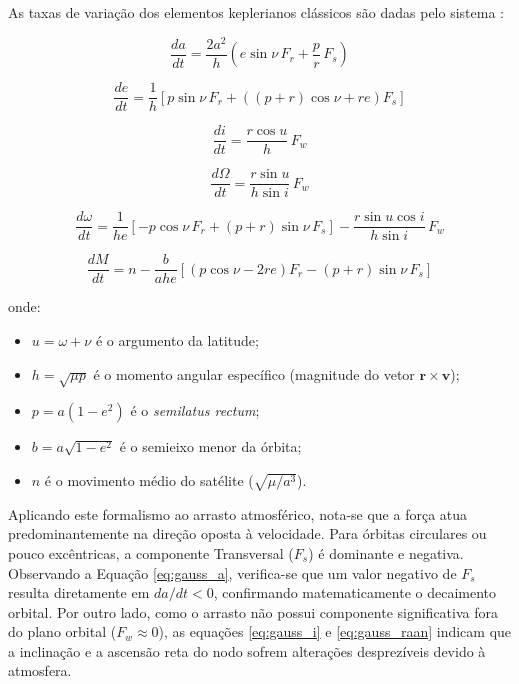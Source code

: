 As taxas de variação dos elementos keplerianos clássicos são dadas pelo sistema \cite{Vallado2013}:

\begin{equation} \label{eq:gauss_a}
    \frac{da}{dt} = \frac{2a^2}{h} \left( e \sin \nu \, F_r + \frac{p}{r} \, F_s \right)
\end{equation}

\begin{equation} \label{eq:gauss_e}
    \frac{de}{dt} = \frac{1}{h} \left[ p \sin \nu \, F_r + \left( (p+r) \cos \nu + r e \right) F_s \right]
\end{equation}

\begin{equation} \label{eq:gauss_i}
    \frac{di}{dt} = \frac{r \cos u}{h} \, F_w
\end{equation}

\begin{equation} \label{eq:gauss_raan}
    \frac{d\Omega}{dt} = \frac{r \sin u}{h \sin i} \, F_w
\end{equation}

\begin{equation} \label{eq:gauss_omega}
    \frac{d\omega}{dt} = \frac{1}{h e} \left[ -p \cos \nu \, F_r + (p+r) \sin \nu \, F_s \right] - \frac{r \sin u \cos i}{h \sin i} \, F_w
\end{equation}

\begin{equation} \label{eq:gauss_M}
    \frac{dM}{dt} = n - \frac{b}{a h e} \left[ (p \cos \nu - 2re) F_r - (p+r) \sin \nu \, F_s \right]
\end{equation}

\noindent onde:
\begin{itemize}
    \item $u = \omega + \nu$ é o argumento da latitude;
    \item $h = \sqrt{\mu p}$ é o momento angular específico (magnitude do vetor $\mathbf{r} \times \mathbf{v}$);
    \item $p = a(1-e^2)$ é o \textit{semilatus rectum};
    \item $b = a\sqrt{1-e^2}$ é o semieixo menor da órbita;
    \item $n$ é o movimento médio do satélite ($\sqrt{\mu/a^3}$).
\end{itemize}

Aplicando este formalismo ao arrasto atmosférico, nota-se que a força atua predominantemente na direção oposta à velocidade. Para órbitas circulares ou pouco excêntricas, a componente Transversal ($F_s$) é dominante e negativa. Observando a Equação \ref{eq:gauss_a}, verifica-se que um valor negativo de $F_s$ resulta diretamente em $da/dt < 0$, confirmando matematicamente o decaimento orbital. Por outro lado, como o arrasto não possui componente significativa fora do plano orbital ($F_w \approx 0$), as equações \ref{eq:gauss_i} e \ref{eq:gauss_raan} indicam que a inclinação e a ascensão reta do nodo sofrem alterações desprezíveis devido à atmosfera.

